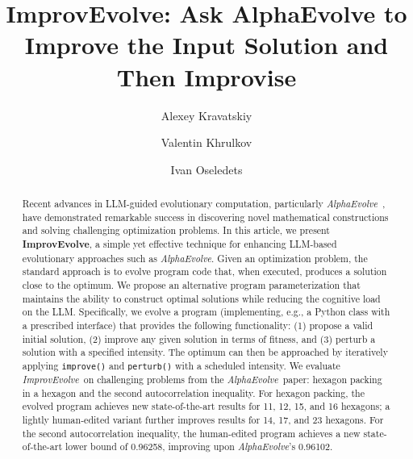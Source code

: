\documentclass[sigconf]{acmart}
\begin{document}
\title{ImprovEvolve: Ask AlphaEvolve to Improve the Input Solution and Then Improvise}

\author{Alexey Kravatskiy}

\author{Valentin Khrulkov}
\email{}

\author{Ivan Oseledets}
\email{}

\renewcommand{\shortauthors}{Kravatskiy et al.}
\newcommand{\alphaevolve}{\emph{AlphaEvolve}}
\newcommand{\improvevolve}{\emph{ImprovEvolve}}
\newcommand{\improvevolvepluse}{\emph{ImprovEvolve+E}}
\newcommand{\gigaevo}{\emph{GigaEvo}}

\begin{abstract}
Recent advances in LLM-guided evolutionary computation, particularly 
\alphaevolve\ \cite{novikov2025alphaevolve}, have demonstrated remarkable success in discovering novel mathematical constructions and solving challenging optimization problems. In this article, we present 
\textbf{ImprovEvolve}, a simple yet effective technique for enhancing LLM-based evolutionary approaches such as \alphaevolve. Given an optimization problem, the standard approach is to evolve program code that, when executed, produces a solution close to the optimum. We propose an alternative program parameterization that maintains the ability to construct optimal solutions while reducing the cognitive load on the LLM. Specifically, we evolve a program (implementing, e.g., a Python class with a prescribed interface) that provides the following functionality: (1) propose a valid initial solution, (2) improve any given solution in terms of fitness, and (3) perturb a solution with a specified intensity. The optimum can then be approached by iteratively applying 
\texttt{improve()} and \texttt{perturb()} with a scheduled intensity. We evaluate \improvevolve\ on challenging problems from the \alphaevolve\ paper: hexagon packing in a hexagon and the second autocorrelation inequality. For hexagon packing, the evolved program achieves new state-of-the-art results for 11, 12, 15, and 16 hexagons; a lightly human-edited variant further improves results for 14, 17, and 23 hexagons. For the second autocorrelation inequality, the human-edited program achieves a new state-of-the-art lower bound of 0.96258, improving upon \alphaevolve's 0.96102.
\end{abstract}
\end{document}
